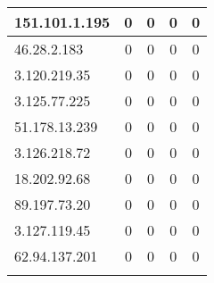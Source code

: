 \documentclass{article}
\begin{document}
\begin{longtable}{|>{\raggedright\arraybackslash}p{3cm}|c|c|c|c|}
    
    \rowcolor{lightgreen} %
    
    151.101.1.195 & 0 & 0 & 0 & 0 \\
    \hline
    
    
    \rowcolor{lightgreen} %
    
    46.28.2.183 & 0 & 0 & 0 & 0 \\
    \hline
    
    
    \rowcolor{lightgreen} %
    
    3.120.219.35 & 0 & 0 & 0 & 0 \\
    \hline
    
    
    \rowcolor{lightgreen} %
    
    3.125.77.225 & 0 & 0 & 0 & 0 \\
    \hline
    
    
    \rowcolor{lightgreen} %
    
    51.178.13.239 & 0 & 0 & 0 & 0 \\
    \hline
    
    
    \rowcolor{lightgreen} %
    
    3.126.218.72 & 0 & 0 & 0 & 0 \\
    \hline
    
    
    \rowcolor{lightgreen} %
    
    18.202.92.68 & 0 & 0 & 0 & 0 \\
    \hline
    
    
    \rowcolor{lightgreen} %
    
    89.197.73.20 & 0 & 0 & 0 & 0 \\
    \hline
    
    
    \rowcolor{lightgreen} %
    
    3.127.119.45 & 0 & 0 & 0 & 0 \\
    \hline
    
    
    \rowcolor{lightgreen} %
    
    62.94.137.201 & 0 & 0 & 0 & 0 \\
    \hline
    
    
    \rowcolor{lightgreen} %
    

\end{longtable}
\end{document}
